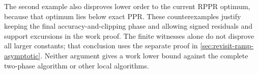 The second example also disproves lower order to the current RPPR optimum,
because that optimum lies below exact PPR. These counterexamples justify
keeping the final accuracy-and-clipping phase and allowing signed residuals
and support excursions in the work proof. The finite witnesses alone do
not disprove all larger constants; that conclusion uses the separate proof
in \cref{sec:revisit-ramp-asymptotic}. Neither argument gives a work lower
bound against the complete two-phase algorithm or other local algorithms.
